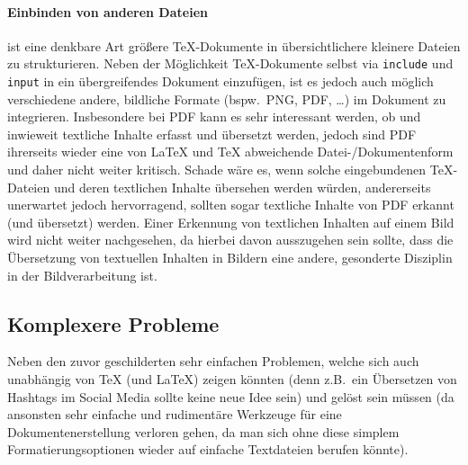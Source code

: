 \paragraph*{Einbinden von anderen Dateien\label{par:anderedateien}} ist eine denkbare Art größere \TeX{}-Dokumente in übersichtlichere kleinere Dateien zu strukturieren. Neben der Möglichkeit \TeX{}-Dokumente selbst via \texttt{include} und \texttt{input} in ein übergreifendes Dokument einzufügen, ist es jedoch auch möglich verschiedene andere, bildliche Formate (bspw.\ PNG, PDF, \ldots) im Dokument zu integrieren. Insbesondere bei PDF kann es sehr interessant werden, ob und inwieweit textliche Inhalte erfasst und übersetzt werden, jedoch sind PDF ihrerseits wieder eine von \LaTeX{} und \TeX{} abweichende Datei-/Dokumentenform und daher nicht weiter kritisch. Schade wäre es, wenn solche eingebundenen \TeX{}-Dateien und deren textlichen Inhalte übersehen werden würden, andererseits unerwartet jedoch hervorragend, sollten sogar textliche Inhalte von PDF erkannt (und übersetzt) werden. Einer Erkennung von textlichen Inhalten auf einem Bild wird nicht weiter nachgesehen, da hierbei davon ausszugehen sein sollte, dass die Übersetzung von textuellen Inhalten in Bildern eine andere, gesonderte Disziplin in der Bildverarbeitung ist.%

\newpage
\subsection{Komplexere Probleme}
Neben den zuvor geschilderten sehr einfachen Problemen, welche sich auch unabhängig von \TeX{} (und \LaTeX{}) zeigen könnten (denn z.B.\ ein Übersetzen von Hashtags im Social Media sollte keine neue Idee sein) und gelöst sein müssen (da ansonsten sehr einfache und rudimentäre Werkzeuge für eine Dokumentenerstellung verloren gehen, da man sich ohne diese simplem Formatierungsoptionen wieder auf einfache Textdateien berufen könnte).%

